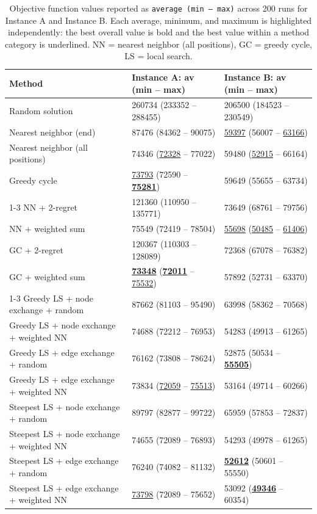 \begin{table}[h!]
\centering
\footnotesize
\setlength{\tabcolsep}{3pt}
\renewcommand{\arraystretch}{1.5}
\caption{Objective function values reported as \texttt{average (min -- max)} across 200 runs for Instance A and Instance B. Each average, minimum, and maximum is highlighted independently: the best overall value is bold and the best value within a method category is underlined. NN = nearest neighbor (all positions), GC = greedy cycle, LS = local search.}
\label{tab:obj_results}
\vspace{0.5em}
\begin{tabularx}{\textwidth}{p{7.2cm} X X}
\toprule
\textbf{Method} & \textbf{Instance A: av (min -- max)} & \textbf{Instance B: av (min -- max)} \\
\midrule
Random solution & 260734 (233352 -- 288455) & 206500 (184523 -- 230549) \\
Nearest neighbor (end) & 87476 (84362 -- 90075) & \underline{59397} (56007 -- \underline{63166}) \\
Nearest neighbor (all positions) & 74346 (\underline{72328} -- 77022) & 59480 (\underline{52915} -- 66164) \\
Greedy cycle & \underline{73793} (72590 -- \textbf{\underline{75281}}) & 59649 (55655 -- 63734) \\
\cmidrule{1-3}
NN + 2-regret & 121360 (110950 -- 135771) & 73649 (68761 -- 79756) \\
NN + weighted sum & 75549 (72419 -- 78504) & \underline{55698} (\underline{50485} -- \underline{61406}) \\
GC + 2-regret & 120367 (110303 -- 128089) & 72368 (67078 -- 76382) \\
GC + weighted sum & \textbf{\underline{73348}} (\textbf{\underline{72011}} -- \underline{75532}) & 57892 (52731 -- 63370) \\
\cmidrule{1-3}
Greedy LS + node exchange + random & 87662 (81103 -- 95490) & 63998 (58362 -- 70568) \\
Greedy LS + node exchange + weighted NN & 74688 (72212 -- 76953) & 54283 (49913 -- 61265) \\
Greedy LS + edge exchange + random & 76162 (73808 -- 78624) & 52875 (50534 -- \textbf{\underline{55505}}) \\
Greedy LS + edge exchange + weighted NN & 73834 (\underline{72059} -- \underline{75513}) & 53164 (49714 -- 60266) \\
Steepest LS + node exchange + random & 89797 (82877 -- 99722) & 65959 (57853 -- 72837) \\
Steepest LS + node exchange + weighted NN & 74655 (72089 -- 76893) & 54293 (49978 -- 61265) \\
Steepest LS + edge exchange + random & 76240 (74082 -- 81132) & \textbf{\underline{52612}} (50601 -- 55550) \\
Steepest LS + edge exchange + weighted NN & \underline{73798} (72089 -- 75652) & 53092 (\textbf{\underline{49346}} -- 60354) \\
\bottomrule
\end{tabularx}
\end{table}

